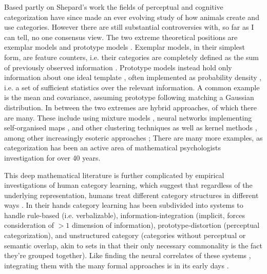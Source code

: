 \documentclass[doc,12pt]{apa}        %
\begin{document}
Based partly on Shepard's work the fields of perceptual and cognitive categorization have since made an ever evolving study of how animals create and use categories.  However there are still substantial controversies with, so far as I can tell, no one consensus view.  The two extreme theoretical positions are exemplar models and prototype models \cite{Ashby:2005p4764}.  Exemplar models, in their simplest form, are feature counters, i.e. their categories are completely defined as the sum of previously observed information \cite{Nosofsky:1988p9104}.  Prototype models instead hold only information about one ideal template \cite{Rosch:1973p9108}, often implemented as probability density \cite{Ashby:1995p9109}, i.e. a set of sufficient statistics over the relevant information.  A common example is the mean and covariance, assuming prototype following matching a Gaussian distribution.  In between the two extremes are hybrid approaches, of which there are many.  These include using mixture models \cite{Rossee:2002p9112}, neural networks implementing self-organised maps \cite{Love:2004p9110}, and other clustering techniques \cite{Kruschke:2012p9111} as well as kernel methods \cite{Jakel:2008p9113}, among other increasingly esoteric approaches \cite{Martin:2012p9185}; There are many more examples, as categorization has been an active area of mathematical psychologists investigation for over 40 years.

This deep mathematical literature is further complicated by empirical investigations of human category learning, which suggest that regardless of the underlying representation, humans treat different category structures in different ways \cite{Ashby:2011p9148}.  In their hands category learning has been subdivided
into systems to handle rule-based (i.e. verbalizable), information-integration (implicit, forces consideration of $>1$ dimension of information), prototype-distortion (perceptual categorization), and unstructured category (categories without perceptual or semantic overlap, akin to sets in that their only necessary commonality is the fact they're grouped together).  Like finding the neural correlates of these systems \cite{Ashby:2005p9152,Ashby:2006p9153}, integrating them with the many formal approaches is in its early days \cite{Ashby:2011p9148}.

\end{document}
